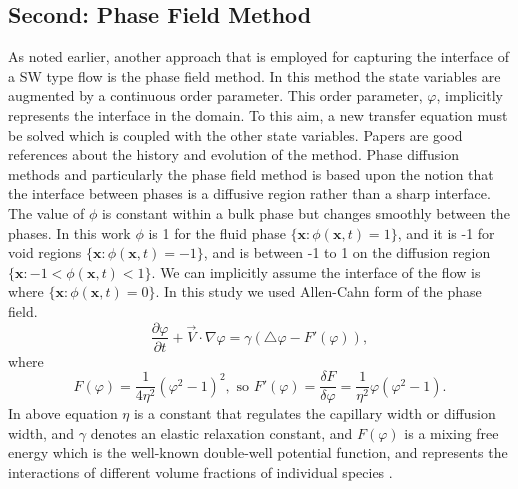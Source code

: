 \documentclass[letterpaper,10pt]{article}
\begin{document}
\subsection{Second: Phase Field Method} \label{phase field}
As noted earlier, another approach that is employed 
for capturing the interface of a SW type flow is the phase field method.
In this method the state variables are augmented by a continuous
order parameter. This order parameter, $\varphi$, 
implicitly represents the interface in the domain. To this aim, a new transfer equation must be solved which is coupled with the other state variables. 
Papers \cite{Chen2002,Anderson1998,Boettinger2002,Kim2012} are good references about the history and evolution of the method.
Phase diffusion methods and particularly the phase field method is based upon the notion that the interface between phases is a diffusive region rather than a sharp interface. 
The value of $\phi$ is constant within a bulk phase but changes smoothly between the phases. In this work $\phi$ is 1 for the fluid phase $ \lbrace \textbf{x}: \phi(\textbf{x},t)=1 \rbrace  $, 
and it is -1 for void regions $ \lbrace \textbf{x}: \phi(\textbf{x},t)=-1 \rbrace  $, and is between -1 to 1 on the diffusion region $ \lbrace \textbf{x}: -1 < \phi(\textbf{x},t) < 1 \rbrace  $. 
We can implicitly assume the interface of the flow is where $ \lbrace \textbf{x}: \phi(\textbf{x},t)= 0 \rbrace  $.
In this study we used Allen-Cahn form of the phase field. 
\begin{equation} 
        \label{allencahn}
        \frac{\partial \varphi }{\partial t} + \overrightarrow{V}\cdot \nabla \varphi = 
        \gamma (\bigtriangleup\varphi -F'(\varphi)),
\end{equation}
where
\begin{equation} 
        \label{fprime}
        F(\varphi)=\frac{1}{4\eta^2} (\varphi^2-1)^2 ,\text{\ so \ \ } F'(\varphi)= \frac{\delta F}{\delta \varphi} = \frac{1}{\eta^2} \varphi (\varphi^2 -1).
\end{equation}
In above equation $\eta$ is a constant that regulates the capillary width or diffusion width, and $ \gamma $ denotes an elastic relaxation constant, and $F(\varphi)$ is 
a mixing free energy which is the well-known double-well potential function, and represents the interactions of different volume fractions of individual species \cite{Bronsard1990,Larson1999}.
\end{document}
